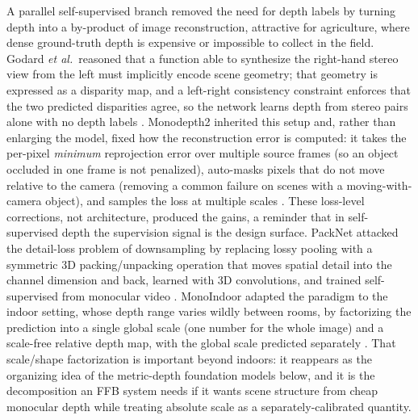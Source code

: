 A parallel self-supervised branch removed the need for depth labels by turning depth into a by-product of image reconstruction, attractive for agriculture, where dense ground-truth depth is expensive or impossible to collect in the field. Godard \textit{et al.}\ reasoned that a function able to synthesize the right-hand stereo view from the left must implicitly encode scene geometry; that geometry is expressed as a disparity map, and a left-right consistency constraint enforces that the two predicted disparities agree, so the network learns depth from stereo pairs alone with no depth labels \cite{godard2017monodepth}. Monodepth2 inherited this setup and, rather than enlarging the model, fixed how the reconstruction error is computed: it takes the per-pixel \emph{minimum} reprojection error over multiple source frames (so an object occluded in one frame is not penalized), auto-masks pixels that do not move relative to the camera (removing a common failure on scenes with a moving-with-camera object), and samples the loss at multiple scales \cite{godard2019monodepth2}. These loss-level corrections, not architecture, produced the gains, a reminder that in self-supervised depth the supervision signal is the design surface. PackNet attacked the detail-loss problem of downsampling by replacing lossy pooling with a symmetric 3D packing/unpacking operation that moves spatial detail into the channel dimension and back, learned with 3D convolutions, and trained self-supervised from monocular video \cite{guizilini2020packnet}. MonoIndoor adapted the paradigm to the indoor setting, whose depth range varies wildly between rooms, by factorizing the prediction into a single global scale (one number for the whole image) and a scale-free relative depth map, with the global scale predicted separately \cite{ji2021monoindoor}. That scale/shape factorization is important beyond indoors: it reappears as the organizing idea of the metric-depth foundation models below, and it is the decomposition an FFB system needs if it wants scene structure from cheap monocular depth while treating absolute scale as a separately-calibrated quantity.

